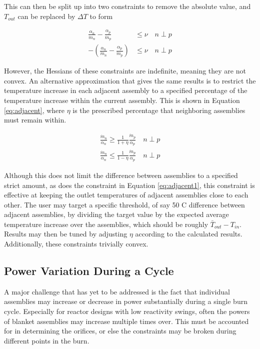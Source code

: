 \documentclass[11pt, oneside]{article}   	%
\begin{document}
This can then be split up into two constraints to remove the absolute value, and $T_{out}$ can be replaced by $\Delta T$ to form

\begin{align}
\frac{\alpha_n}{\dot{m}_n} - \frac{\alpha_p}{\dot{m}_p} & \leq \nu \quad n \perp p \\
-(\frac{\alpha_n}{\dot{m}_n} - \frac{\alpha_p}{\dot{m}_p}) & \leq \nu \quad n \perp p \nonumber
\end{align}

However, the Hessians of these constraints are indefinite, meaning they are not convex. 
An alternative approximation that gives the same results is to restrict the temperature increase in each adjacent assembly to a specified percentage of the temperature increase within the current assembly.
This is shown in Equation \ref{eq:adjacent}, where $\eta$ is the prescribed percentage that neighboring assemblies must remain within.

\begin{align}
\frac{\dot{m}_n}{\alpha_n} \geq \frac{1}{1+\eta} \frac{\dot{m}_p}{\alpha_p} \quad n \perp p \label{eq:adjacent} \\
\frac{\dot{m}_n}{\alpha_n} \leq \frac{1}{1-\eta} \frac{\dot{m}_p}{\alpha_p} \quad n \perp p \nonumber
\end{align}

Although this does not limit the difference between assemblies to a specified strict amount, as does the constraint in Equation \ref{eq:adjacent1}, this constraint is effective at keeping the outlet temperatures of adjacent assemblies close to each other.
The user may target a specific threshold, of say 50 C difference between adjacent assemblies, by dividing the target value by the expected average temperature increase over the assemblies, which should be roughly $\bar{T}_{out} - T_{in}$. 
Results may then be tuned by adjusting $\eta$ according to the calculated results.
Additionally, these constraints trivially convex.

\subsection{Power Variation During a Cycle}

A major challenge that has yet to be addressed is the fact that individual assemblies may increase or decrease in power substantially during a single burn cycle.
Especially for reactor designs with low reactivity swings, often the powers of blanket assemblies may increase multiple times over.
This must be accounted for in determining the orifices, or else the constraints may be broken during different points in the burn.
\end{document}
